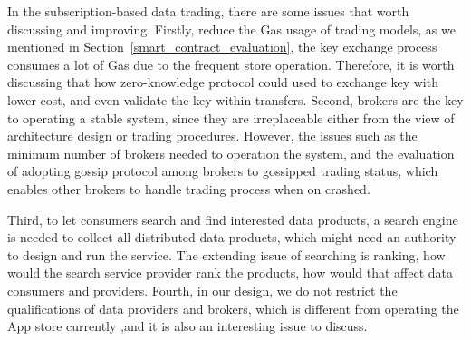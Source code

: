 \documentclass[conference]{IEEEtran}
\begin{document}
In the subscription-based data trading, there are some issues that worth discussing and improving. Firstly, reduce the Gas usage of trading models, as we mentioned in Section~\ref{smart_contract_evaluation}, the key exchange process consumes a lot of Gas due to the frequent store operation. Therefore, it is worth discussing that how zero-knowledge protocol could used to exchange key with lower cost, and even validate the key within transfers. Second, brokers are the key to operating a stable system, since they are irreplaceable either from the view of architecture design or trading procedures. However, the issues such as the minimum number of brokers needed to operation the system, and the evaluation of adopting gossip protocol among brokers to gossipped trading status, which enables other brokers to handle trading process when on crashed.

Third, to let consumers search and find interested data products, a search engine is needed to collect all distributed data products, which might need an authority to design and run the service. The extending issue of searching is ranking, how would the search service provider rank the products, how would that affect data consumers and providers. Fourth, in our design, we do not restrict the qualifications of data providers and brokers, which is different from operating the App store currently ,and it is also an interesting issue to discuss.



\end{document}
